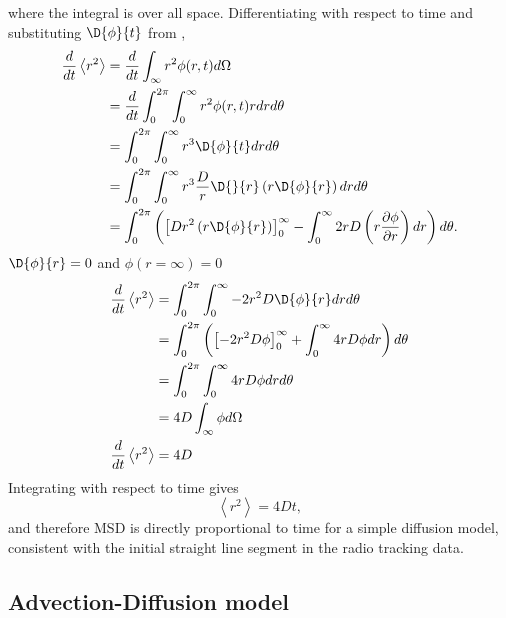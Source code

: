 %
where the integral is over all space.
%
Differentiating  with respect to time and substituting $\D{\phi}{t}$ from ,
%
\begin{equation}
\begin{split}
\frac{d}{dt} \left<r^2\right> &= \frac{d}{dt}\int_{\infty}r^2 \phi(r,t) d\Omega \\
                            &= \frac{d}{dt} \int_0^{2\pi}\int_0^{\infty} r^2 \phi(r,t) r dr d\theta \\
                           &= \int_0^{2\pi} \int_0^{\infty} r^3 \D{\phi}{t} dr d\theta \\
                            &= \int_0^{2\pi} \int_0^{\infty} r^3 \frac{D}{r} \D{}{r } \left( r \D{ \phi}{ r}\right) dr d\theta \\
                            &= \int_0^{2\pi} \left( \left[ D r^2 \left( r \D{ \phi}{ r}\right) \right]_0^{\infty} - \int_0^{\infty} 2rD \left(r \frac{\partial \phi}{\partial r} \right) dr \right) d\theta. \\
\label{eqn:diffusion_1}
\end{split}
\end{equation}
%
$\D{\phi}{r} = 0$ and $\phi(r=\infty)=0$
%
\begin{equation}
\begin{split}
\frac{d}{dt} \left<r^2\right> &= \int_0^{2\pi} \int_0^{\infty} -2r^2D \D{ \phi}{r}dr d\theta \\
                            &= \int_0^{2\pi} \left( \left[-2r^2D \phi \right]_0^{\infty} + \int_0^{\infty} 4rD \phi dr \right)d\theta \\
                            &= \int_0^{2\pi} \int_0^{\infty} 4rD\phi dr d\theta \\
                            &= 4D \int_{\infty} \phi d\Omega \\
\frac{d}{dt} \left<r^2\right>  &= 4D \\
\label{eqn:diffusion_1}
\end{split}
\end{equation}
Integrating with respect to time gives
%
\begin{equation}
\left<r^2\right> = 4Dt ,
\label{eqn:D_msd}
\end{equation}
%
and therefore MSD is directly proportional to time for a simple diffusion model, consistent with the initial straight line segment in the radio tracking data.




\subsection{Advection-Diffusion model}

